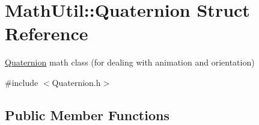 \hypertarget{structMathUtil_1_1Quaternion}{}\section{Math\+Util\+:\+:Quaternion Struct Reference}
\label{structMathUtil_1_1Quaternion}


\hyperlink{structMathUtil_1_1Quaternion}{Quaternion} math class (for dealing with animation and orientation)  




{\ttfamily \#include $<$Quaternion.\+h$>$}

\subsection*{Public Member Functions}
